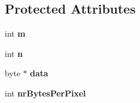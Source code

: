 \subsection*{Protected Attributes}
\begin{DoxyCompactItemize}
\item 
\hypertarget{classCartWheel_1_1Util_1_1Image_ab4ce21aa87da68591f56eff94c8aecfd}{
int {\bfseries m}}
\label{classCartWheel_1_1Util_1_1Image_ab4ce21aa87da68591f56eff94c8aecfd}

\item 
\hypertarget{classCartWheel_1_1Util_1_1Image_ad6adadea915e86ea9f5da52137b47eb5}{
int {\bfseries n}}
\label{classCartWheel_1_1Util_1_1Image_ad6adadea915e86ea9f5da52137b47eb5}

\item 
\hypertarget{classCartWheel_1_1Util_1_1Image_ac2037ebb72c4db4068539a9504f18d51}{
byte $\ast$ {\bfseries data}}
\label{classCartWheel_1_1Util_1_1Image_ac2037ebb72c4db4068539a9504f18d51}

\item 
\hypertarget{classCartWheel_1_1Util_1_1Image_ad627eb79421f7384871e4f5f389a8c98}{
int {\bfseries nrBytesPerPixel}}
\label{classCartWheel_1_1Util_1_1Image_ad627eb79421f7384871e4f5f389a8c98}

\end{DoxyCompactItemize}



